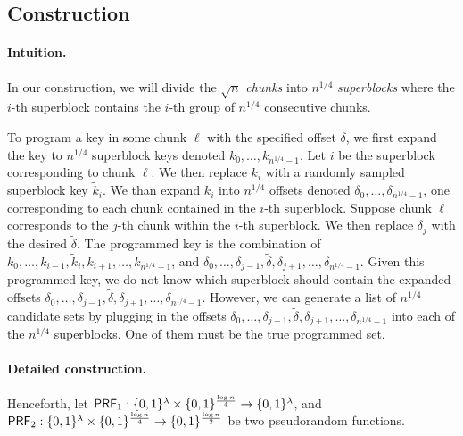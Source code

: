 \subsection{Construction}
\label{sec:ppps-constr}
\paragraph{Intuition.}
In our construction, we will divide the $\sqrt{n}$ {\it chunks}
into $n^{1/4}$ {\it superblocks}
where the $i$-th superblock contains 
the $i$-th group of $n^{1/4}$
consecutive chunks.

To program a \ppps key in some chunk $\ell$ with the specified
offset $\widetilde{\delta}$, 
we first expand the \ppps key to $n^{1/4}$ superblock keys
denoted $k_0, \ldots, k_{n^{1/4}-1}$.
Let $i$ be the superblock corresponding 
to chunk $\ell$. We then replace
$k_{i}$ with a randomly sampled superblock key $\widetilde{k}_{i}$.
We than expand $k_i$ into $n^{1/4}$
offsets denoted $\delta_0, \ldots, \delta_{n^{1/4}-1}$, 
one corresponding to each chunk contained in the $i$-th superblock.
Suppose chunk $\ell$ corresponds to the $j$-th chunk within the $i$-th
superblock. 
We then replace $\delta_j$ 
with the desired $\tilde{\delta}$. 
The programmed key is the combination of  
$k_0, \ldots, k_{i-1}, \widetilde{k}_{i}, k_{i+1}, \ldots, k_{n^{1/4}-1}$,
and 
$\delta_0, \ldots, \delta_{j-1}, \widetilde{\delta}, \delta_{j+1}, 
\ldots, \delta_{n^{1/4}-1}$.
Given this programmed key, we do not know 
which 
superblock should contain the expanded offsets 
$\delta_0, \ldots, \delta_{j-1}, \widetilde{\delta}, \delta_{j+1}, 
\ldots, \delta_{n^{1/4}-1}$.
However, we can generate
a list of $n^{1/4}$ candidate sets 
by plugging in the offsets 
$\delta_0, \ldots, \delta_{j-1}, \widetilde{\delta}, \delta_{j+1}, 
\ldots, \delta_{n^{1/4}-1}$ into 
each of the $n^{1/4}$ superblocks.
One of them must be the true programmed set. 






\paragraph{Detailed \ppps construction.}
Henceforth, 
let 
$\mathsf{PRF}_1: \{0,1\}^{\lambda}\times \{0,1\}^{\frac{\log n}{4}}\to
\{0,1\}^{\lambda}$, and 
$\mathsf{PRF}_2:\{0,1\}^{\lambda}\times \{0,1\}^{\frac{\log n}{4}}\to
\{0,1\}^{\frac{\log n}{2}}$
be two pseudorandom functions.


